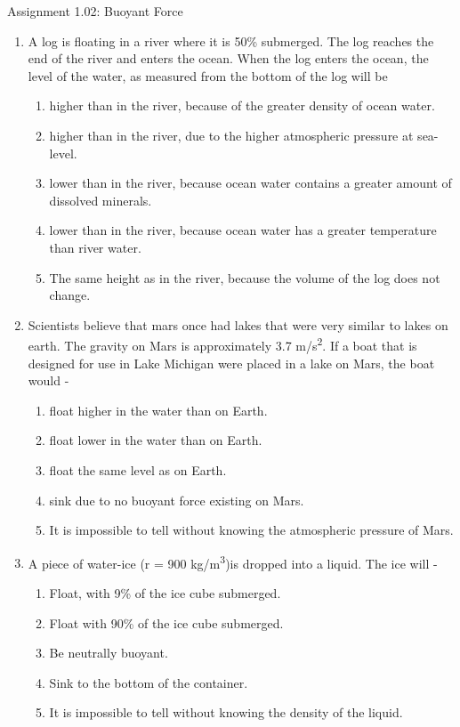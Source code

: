\documentclass[letterpaper, 11pt]{article}
\begin{document}
	

	
\begin{center}Assignment 1.02: Buoyant Force
\end{center}

\begin{enumerate}




	\item A log is floating in a river where it is 50\% submerged.  The log reaches the end of the river and enters the ocean.  When the log enters the ocean, the level of the water, as measured from the bottom of the log will be
	\begin{enumerate}
		\item higher than in the river, because of the greater density of ocean water.
		\item higher than in the river, due to the higher atmospheric pressure at sea-level.
		\item lower than in the river, because ocean water contains a greater amount of dissolved minerals.
		\item lower than in the river, because ocean water has a greater temperature than river water.
		\item The same height as in the river, because the volume of the log does not change.
	\end{enumerate}
 
	\item Scientists believe that mars once had lakes that were very similar to lakes on earth.  The gravity on Mars is approximately 3.7 m/s\textsuperscript{2}.  If a boat that is designed for use in Lake Michigan were placed in a lake on Mars, the boat would - 
	\begin{enumerate}
		\item float higher in the water than on Earth.
		\item float lower in the water than on Earth.
		\item float the same level as on Earth.
		\item sink due to no buoyant force existing on Mars.
		\item It is impossible to tell without knowing the atmospheric pressure of Mars.
	\end{enumerate}
	\item A piece of water-ice (r = 900 kg/m\textsuperscript{3})is dropped into a liquid.  The ice will - 
	\begin{enumerate}
		\item Float, with 9\% of the ice cube submerged.
		\item Float with 90\% of the ice cube submerged.
		\item Be neutrally buoyant.
		\item Sink to the bottom of the container.
		\item It is impossible to tell without knowing the density of the liquid.
	\end{enumerate}


\end{enumerate}
\end{document}
